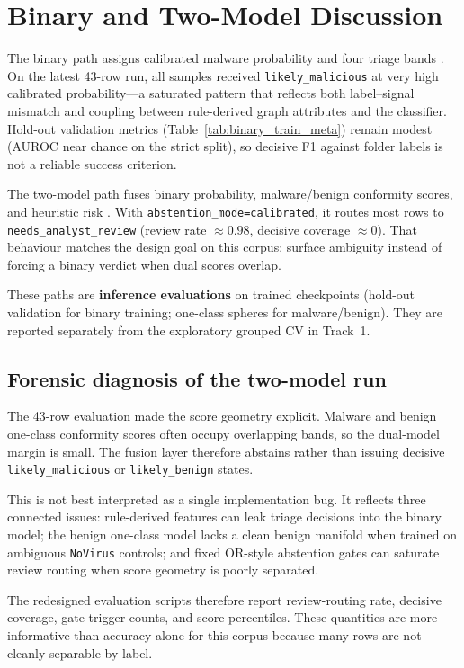 \section{Binary and Two-Model Discussion}

The binary path assigns calibrated malware probability and four triage bands \cite{guo2017calibration}. On the latest 43-row run, all samples received \texttt{likely\_malicious} at very high calibrated probability---a saturated pattern that reflects both label--signal mismatch and coupling between rule-derived graph attributes and the classifier. Hold-out validation metrics (Table~\ref{tab:binary_train_meta}) remain modest (AUROC near chance on the strict split), so decisive F1 against folder labels is not a reliable success criterion.

The two-model path fuses binary probability, malware/benign conformity scores, and heuristic risk \cite{ruff2018deep}. With \texttt{abstention\_mode=calibrated}, it routes most rows to \texttt{needs\_analyst\_review} (review rate ${\approx}0.98$, decisive coverage ${\approx}0$). That behaviour matches the design goal on this corpus: surface ambiguity instead of forcing a binary verdict when dual scores overlap.

These paths are \textbf{inference evaluations} on trained checkpoints (hold-out validation for binary training; one-class spheres for malware/benign). They are reported separately from the exploratory grouped CV in Track~1.

\subsection{Forensic diagnosis of the two-model run}

The 43-row evaluation made the score geometry explicit. Malware and benign one-class conformity scores often occupy overlapping bands, so the dual-model margin is small. The fusion layer therefore abstains rather than issuing decisive \texttt{likely\_malicious} or \texttt{likely\_benign} states.

This is not best interpreted as a single implementation bug. It reflects three connected issues: rule-derived features can leak triage decisions into the binary model; the benign one-class model lacks a clean benign manifold when trained on ambiguous \texttt{NoVirus} controls; and fixed OR-style abstention gates can saturate review routing when score geometry is poorly separated.

The redesigned evaluation scripts therefore report review-routing rate, decisive coverage, gate-trigger counts, and score percentiles. These quantities are more informative than accuracy alone for this corpus because many rows are not cleanly separable by label.

